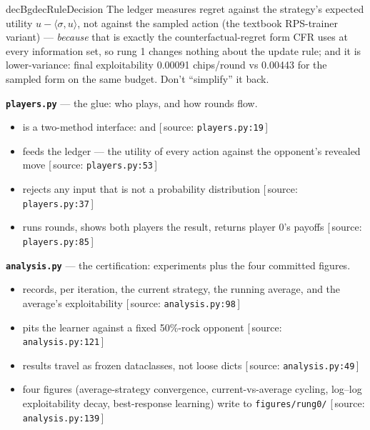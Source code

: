 \documentclass[11pt]{article}
\newenvironment{decision}{\begin{calloutbox}{decBg}{decRule}{Decision}}{\end{calloutbox}}
\newcommand{\source}[1]{{\small\textcolor{softgray}{[\,source: \texttt{#1}\,]}}}
\begin{document}
\begin{decision}
The ledger measures regret against the strategy's expected utility
$u - \langle\sigma, u\rangle$, not against the sampled action (the textbook
RPS-trainer variant) --- \emph{because} that is exactly the counterfactual-regret
form CFR uses at every information set, so rung 1 changes nothing about the
update rule; and it is lower-variance: final exploitability 0.00091 chips/round
vs 0.00443 for the sampled form on the same budget. Don't ``simplify'' it back.
\end{decision}

\medskip
\noindent\textbf{\texttt{players.py}} --- the glue: who plays, and how rounds flow.
\begin{itemize}[leftmargin=*, nosep]
  \item {} is a two-method interface:  and
         \source{players.py:19}
  \item {} feeds the ledger
         --- the utility of every action against the
        opponent's revealed move \source{players.py:53}
  \item {} rejects any input that is not a probability
        distribution \source{players.py:37}
  \item {} runs rounds, shows both
        players the result, returns player 0's payoffs \source{players.py:85}
\end{itemize}

\medskip
\noindent\textbf{\texttt{analysis.py}} --- the certification: experiments plus
the four committed figures.
\begin{itemize}[leftmargin=*, nosep]
  \item {} records, per iteration, the current strategy,
        the running average, and the average's exploitability
        \source{analysis.py:98}
  \item {} pits the learner against a fixed 50\%-rock
        opponent \source{analysis.py:121}
  \item results travel as frozen dataclasses, not loose dicts
        \source{analysis.py:49}
  \item four figures (average-strategy convergence, current-vs-average cycling,
        log--log exploitability decay, best-response learning) write to
        \texttt{figures/rung0/} \source{analysis.py:139}
\end{itemize}
\end{document}
